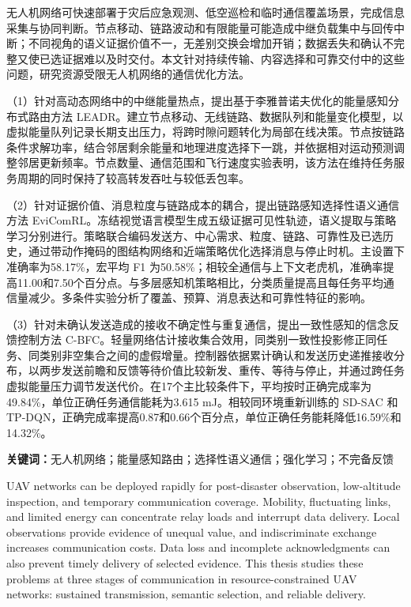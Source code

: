 
无人机网络可快速部署于灾后应急观测、低空巡检和临时通信覆盖场景，完成信息采集与协同判断。节点移动、链路波动和有限能量可能造成中继负载集中与回传中断；不同视角的语义证据价值不一，无差别交换会增加开销；数据丢失和确认不完整又使已选证据难以及时交付。本文针对持续传输、内容选择和可靠交付中的这些问题，研究资源受限无人机网络的通信优化方法。

（1）针对高动态网络中的中继能量热点，提出基于李雅普诺夫优化的能量感知分布式路由方法 LEADR。建立节点移动、无线链路、数据队列和能量变化模型，以虚拟能量队列记录长期支出压力，将跨时隙问题转化为局部在线决策。节点按链路条件求解功率，结合邻居剩余能量和地理进度选择下一跳，并依据相对运动预测调整邻居更新频率。节点数量、通信范围和飞行速度实验表明，该方法在维持任务服务周期的同时保持了较高转发吞吐与较低丢包率。

（2）针对证据价值、消息粒度与链路成本的耦合，提出链路感知选择性语义通信方法 EviComRL。冻结视觉语言模型生成五级证据可见性轨迹，语义提取与策略学习分别进行。策略联合编码发送方、中心需求、粒度、链路、可靠性及已选历史，通过带动作掩码的图结构网络和近端策略优化选择消息与停止时机。主设置下准确率为58.17\%，宏平均 F1 为50.58\%；相较全通信与上下文老虎机，准确率提高11.00和7.50个百分点。与多层感知机策略相比，分类质量提高且每任务平均通信量减少。多条件实验分析了覆盖、预算、消息表达和可靠性特征的影响。

（3）针对未确认发送造成的接收不确定性与重复通信，提出一致性感知的信念反馈控制方法 C-BFC。轻量网络估计接收集合效用，同类别一致性投影修正同任务、同类别非空集合之间的虚假增量。控制器依据累计确认和发送历史递推接收分布，以两步发送前瞻和反馈等待价值比较新发、重传、等待与停止，并通过跨任务虚拟能量压力调节发送代价。在17个主比较条件下，平均按时正确完成率为49.84\%，单位正确任务通信能耗为3.615 mJ。相较同环境重新训练的 SD-SAC 和 TP-DQN，正确完成率提高0.87和0.66个百分点，单位正确任务能耗降低16.59\%和14.32\%。

\vspace{1em}
\noindent\textbf{关键词：}无人机网络；能量感知路由；选择性语义通信；强化学习；不完备反馈


UAV networks can be deployed rapidly for post-disaster observation, low-altitude inspection, and temporary communication coverage. Mobility, fluctuating links, and limited energy can concentrate relay loads and interrupt data delivery. Local observations provide evidence of unequal value, and indiscriminate exchange increases communication costs. Data loss and incomplete acknowledgments can also prevent timely delivery of selected evidence. This thesis studies these problems at three stages of communication in resource-constrained UAV networks: sustained transmission, semantic selection, and reliable delivery.

